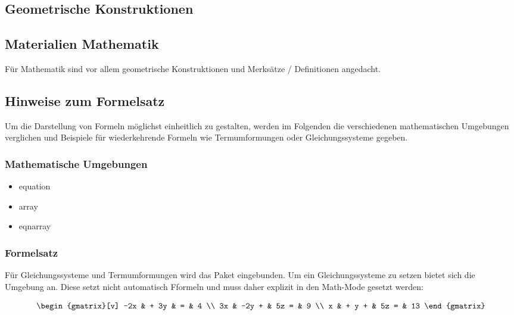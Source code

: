 \subsection{Geometrische Konstruktionen}\label{sec:geometrie}

\subsection{Materialien Mathematik}\label{sec:materialmathe}
Für Mathematik sind vor allem geometrische Konstruktionen und Merksätze / Definitionen angedacht.

\subsection{Hinweise zum Formelsatz}\label{sec:formelsatz}
Um die Darstellung von Formeln möglichst einheitlich zu gestalten, werden im Folgenden die verschiedenen mathematischen Umgebungen verglichen und Beispiele für wiederkehrende Formeln wie Termumformungen oder Gleichungssysteme gegeben.

\subsubsection*{Mathematische Umgebungen}
\begin{itemize}
	\item equation
	\item array
	\item eqnarray
\end{itemize}

\subsubsection*{Formelsatz}

Für Gleichungssysteme und Termumformungen wird das Paket  eingebunden. Um ein Gleichungssysteme zu setzen bietet sich die Umgebung  an. Diese setzt nicht automatisch Fformeln und muss daher explizit in den Math-Mode gesetzt werden:
\begin{example}
\[ \begin{gmatrix}[v]
	-2x & + 3y & = & 4 \\
	3x & -2y + & 5z = & 9 \\
	x & + y + & 5z = & 13
	\end{gmatrix} \]
\end{example}
	
